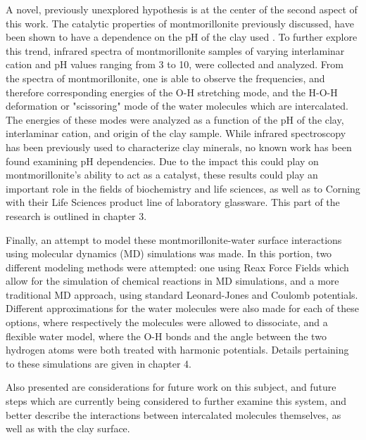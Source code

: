 A novel, previously unexplored hypothesis is at the center of the second aspect of this work. The catalytic properties of montmorillonite previously discussed, have been shown to have a dependence on the pH of the clay used \cite{joshi2009mechanism}. To further explore this trend, infrared spectra of montmorillonite samples of varying interlaminar cation and pH values ranging from 3 to 10, were collected and analyzed. From the spectra of montmorillonite, one is able to observe the frequencies, and therefore corresponding energies of the O-H stretching mode, and the H-O-H deformation or "scissoring" mode of the water molecules which are intercalated. The energies of these modes were analyzed as a function of the pH of the clay, interlaminar cation, and origin of the clay sample. While infrared spectroscopy has been previously used to characterize clay minerals, no known work has been found examining pH dependencies. Due to the impact this could play on montmorillonite's ability to act as a catalyst, these results could play an important role in the fields of biochemistry and life sciences, as well as to Corning with their Life Sciences product line of laboratory glassware. This part of the research is outlined in chapter 3.

Finally, an attempt to model these montmorillonite-water surface interactions using molecular dynamics (MD) simulations was made. In this portion, two different modeling methods were attempted: one using Reax Force Fields which allow for the simulation of chemical reactions in MD simulations, and a more traditional MD approach, using standard Leonard-Jones and Coulomb potentials. Different approximations for the water molecules were also made for each of these options, where respectively the molecules were allowed to dissociate, and a flexible water model, where the O-H bonds and the angle between the two hydrogen atoms were both treated with harmonic potentials. Details pertaining to these simulations are given in chapter 4.

Also presented are considerations for future work on this subject, and future steps which are currently being considered to further examine this system, and better describe the interactions between intercalated molecules themselves, as well as with the clay surface.
 


